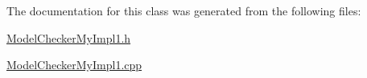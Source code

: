 The documentation for this class was generated from the following files\-:\begin{DoxyCompactItemize}
\item 
\hyperlink{_model_checker_my_impl1_8h}{Model\-Checker\-My\-Impl1.\-h}\item 
\hyperlink{_model_checker_my_impl1_8cpp}{Model\-Checker\-My\-Impl1.\-cpp}\end{DoxyCompactItemize}
